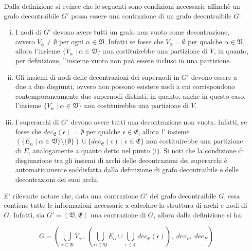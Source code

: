 Dalla definizione si evince che le seguenti sono condizioni necessarie affinch\`e un grafo decontraibile $G'$ possa
essere una contrazione di un grafo decontraibile $G$:
\begin{enumerate}[(i)]
    \item I nodi di $G'$ devono avere tutti un grafo non vuoto come decontrazione, ovvero $V_\alpha \neq \emptyset$
    per ogni $\alpha \in \mathfrak{V}$.
    Infatti se fosse che $V_\alpha = \emptyset$ per qualche $\alpha \in \mathfrak{V}$, allora l'insieme
    $\{V_\alpha \mid \alpha \in \mathfrak{V}\}$ non costituirebbe una partizione di $V$, in quanto, per definizione,
    l'insieme vuoto non pu\`o essere incluso in una partizione.
    \item Gli insiemi di nodi delle decontrazioni dei supernodi in $G'$ devono essere a due a due disgiunti, ovvero
    non possono esistere nodi a cui corrispondono contemporaneamente due supernodi distinti, in quanto, anche in
    questo caso, l'insieme $\{V_\alpha \mid \alpha \in \mathfrak{V}\}$ non costituirebbe una partizione di $V$.
    \item I superarchi di $G'$ devono avere tutti una decontrazione non vuota.
    Infatti, se fosse che $dec_{\mathfrak{E}}(\epsilon) = \emptyset$ per qualche $\epsilon \in \mathfrak{E}$, allora
    l' insieme $(\{E_\alpha \mid \alpha \in \mathfrak{V}\} \setminus \{ \emptyset \}) \cup
    \{ dec_{\mathfrak{E}}(\epsilon) \mid \epsilon \in \mathfrak{E}\}$ non costituirebbe una partizione di $E$,
    analogamente a quanto detto nel punto (i). \newline
    Si noti che la condizione di disgiunzione tra gli insiemi di archi delle decontrazioni dei superarchi \`e
    automaticamente soddisfatta dalla definizione di grafo decontraibile e delle decontrazioni dei suoi archi.
\end{enumerate}

E' rilevante notare che, data una contrazione $G'$ del grafo decontraibile $G$, essa contiene tutte le informazioni
necessarie a calcolare la struttura di archi e nodi di $G$.
Infatti, sia $G' = (\mathfrak{V}, \mathfrak{E})$ una contrazione di $G$, allora dalla definizione si ha:

\begin{equation*}
    G = (\bigcup_{\alpha \in \mathfrak{V}} V_\alpha , \;
        (\bigcup_{\alpha \in \mathfrak{V}} E_\alpha \cup \bigcup_{\epsilon \in \mathfrak{E}}{dec_{\mathfrak{E}}(\epsilon)}), \;
        dev_V, \; dec_E) %
\end{equation*}

